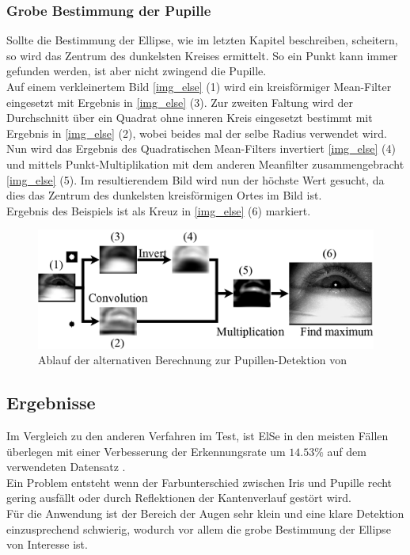 \subsubsection{Grobe Bestimmung der Pupille}
Sollte die Bestimmung der Ellipse, wie im letzten Kapitel beschreiben, scheitern, so wird das Zentrum des dunkelsten Kreises ermittelt. So ein Punkt kann immer gefunden werden, ist aber nicht zwingend die Pupille.\\
Auf einem verkleinertem Bild \autoref{img_else} (1) wird ein kreisförmiger Mean-Filter eingesetzt mit Ergebnis in \autoref{img_else} (3). Zur zweiten Faltung wird der Durchschnitt über ein Quadrat ohne inneren Kreis eingesetzt bestimmt mit Ergebnis in \autoref{img_else} (2), wobei beides mal der selbe Radius verwendet wird.\\
Nun wird das Ergebnis des Quadratischen Mean-Filters invertiert \autoref{img_else} (4) und mittels Punkt-Multiplikation mit dem anderen Meanfilter zusammengebracht \autoref{img_else} (5). Im resultierendem Bild wird nun der höchste Wert gesucht, da dies das Zentrum des dunkelsten kreisförmigen Ortes im Bild ist.\\
Ergebnis des Beispiels ist als Kreuz in \autoref{img_else} (6) markiert. 
\begin{figure}
	\centering
	\includegraphics[width=0.8\linewidth]{img/ElSe}
	\caption{Ablauf der alternativen Berechnung zur Pupillen-Detektion von \cite{ElSe}}
	\label{img_else}
\end{figure}
\subsection{Ergebnisse}
Im Vergleich zu den anderen Verfahren im Test, ist ElSe in den meisten Fällen überlegen mit einer Verbesserung der Erkennungsrate um $14.53\%$ auf dem verwendeten Datensatz \cite{ElSe}.\\
Ein Problem entsteht wenn der Farbunterschied zwischen Iris und Pupille recht gering ausfällt oder durch Reflektionen der Kantenverlauf gestört wird.\\
Für die Anwendung ist der Bereich der Augen sehr klein und eine klare Detektion einzusprechend schwierig, wodurch vor allem die grobe Bestimmung der Ellipse von Interesse ist.